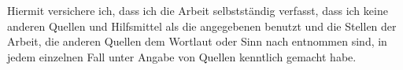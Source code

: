 \newpage
\vspace*{\fill}
\begin{center}Hiermit versichere ich, dass ich die Arbeit selbstständig verfasst, dass ich keine anderen Quellen und Hilfsmittel als die angegebenen benutzt und die Stellen der Arbeit, die anderen Quellen dem Wortlaut oder Sinn nach entnommen sind, in jedem einzelnen Fall unter Angabe von Quellen kenntlich gemacht habe.
\end{center}
\vspace*{\fill}
